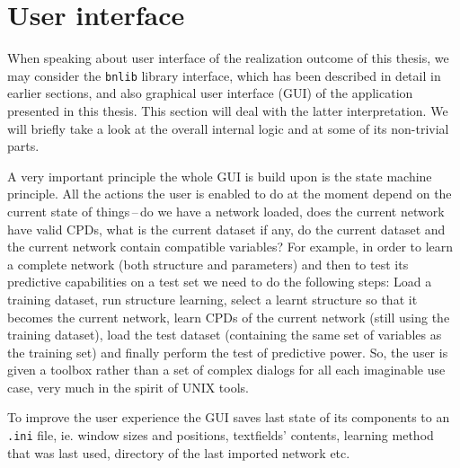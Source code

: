 \documentclass[english,cover]{fitthesis} %
\newcommand{\srccode}[1]{{\tt #1}}         %
\begin{document}
\section{User interface}
When speaking about user interface of the realization outcome of this thesis, we may consider the \srccode{bnlib} library interface, which has been described in detail in earlier sections, and also graphical user interface (GUI) of the application presented in this thesis. This section will deal with the latter interpretation. We will briefly take a look at the overall internal logic and at some of its non-trivial parts.

A very important principle the whole GUI is build upon is the state machine principle. All the actions the user is enabled to do at the moment depend on the current state of things\,--\,do we have a network loaded, does the current network have valid CPDs, what is the current dataset if any, do the current dataset and the current network contain compatible variables? For example, in order to learn a complete network (both structure and parameters) and then to test its predictive capabilities on a test set we need to do the following steps: Load a training dataset, run structure learning, select a learnt structure so that it becomes the current network, learn CPDs of the current network (still using the training dataset), load the test dataset (containing the same set of variables as the training set) and finally perform the test of predictive power. So, the user is given a toolbox rather than a set of complex dialogs for all each imaginable use case, very much in the spirit of UNIX tools.

To improve the user experience the GUI saves last state of its components to an \srccode{.ini} file, ie. window sizes and positions, textfields' contents, learning method that was last used, directory of the last imported network etc.
\end{document}
